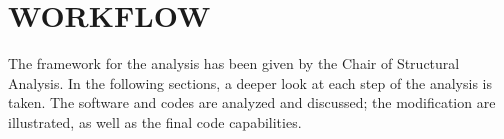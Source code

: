\section{WORKFLOW}
The framework for the analysis has been given by the Chair of Structural Analysis. In the following sections, a deeper look at each step of the analysis is taken. The software and codes are analyzed and discussed; the modification are illustrated, as well as the final code capabilities. 
